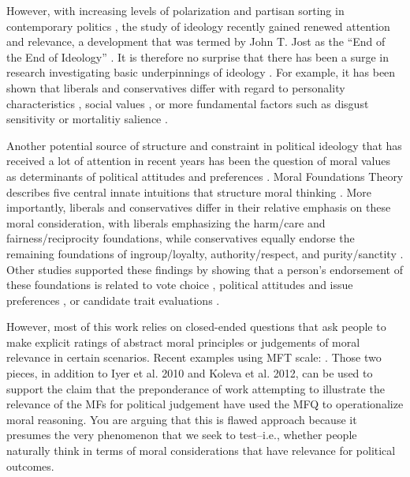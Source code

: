 \documentclass[12pt]{article}
\begin{document}
However, with increasing levels of polarization and partisan sorting in contemporary politics \citep[e.g.][]{iyengar2014fear}, the study of ideology recently gained renewed attention and relevance, a development that was termed by John T. Jost as the ``End of the End of Ideology'' \citeyearpar{jost2006end}. It is therefore no surprise that there has been a surge in research investigating basic underpinnings of ideology \citep[see also][]{jost2003political,jost2009political}. For example, it has been shown that liberals and conservatives differ with regard to personality characteristics \citep{gerber2010personality,hirsh2010compassionate,de2013personality,feldman2013understanding}, social values \citep{schwartz2010basic,schwartz2011basic,piurko2011basic}, or more fundamental factors such as disgust sensitivity \citep{inbar2009conservatives} or mortalitiy salience \citep{burke2013death}.

Another potential source of structure and constraint in political ideology that has received a lot of attention in recent years has been the question of moral values as determinants of political attitudes and preferences \citep{lakoff1995metaphor,haidt2008moral,mcadams2008family}. Moral Foundations Theory describes five central innate intuitions that structure moral thinking \citep{haidt2008moral}. More importantly, liberals and conservatives differ in their relative emphasis on these moral consideration, with liberals emphasizing the harm/care and fairness/reciprocity foundations, while conservatives equally endorse the remaining foundations of ingroup/loyalty, authority/respect, and purity/sanctity \citep{graham2009liberals}. Other studies supported these findings by showing that a person’s endorsement of these foundations is related to vote choice \citep{iyer2010beyond, franks2015using}, political attitudes and issue preferences \citep{koleva2012tracing, low2015moral, clifford2015concerns}, or candidate trait evaluations \citep{clifford2014linking}.

However, most of this work relies on closed-ended questions that ask people to make explicit ratings of abstract moral principles or judgements of moral relevance in certain scenarios. Recent examples using MFT scale: \citet{franks2015using} \citet{low2015moral}. Those two pieces, in addition to Iyer et al. 2010 and Koleva et al. 2012, can be used to support the claim that the preponderance of work attempting to illustrate the relevance of the MFs for political judgement have used the MFQ to operationalize moral reasoning. You are arguing that this is flawed approach because it presumes the very phenomenon that we seek to test--i.e., whether people naturally think in terms of moral considerations that have relevance for political outcomes. 
\end{document}

